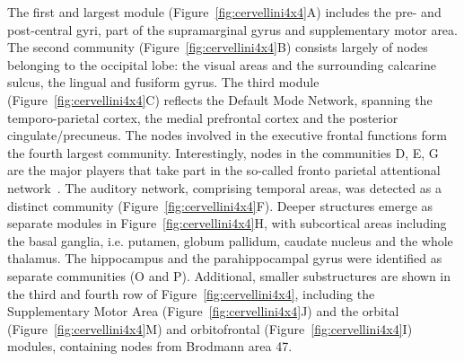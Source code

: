 The first and largest module (Figure~\ref{fig:cervellini4x4}A) includes the pre- and post-central gyri, part of the supramarginal gyrus and supplementary motor area.
The second community (Figure~\ref{fig:cervellini4x4}B) consists largely of nodes belonging to the occipital lobe: the visual areas and the surrounding calcarine sulcus, the lingual and fusiform gyrus.
The third module (Figure~\ref{fig:cervellini4x4}C) reflects the Default Mode Network, spanning the temporo-parietal cortex, the medial prefrontal cortex and the posterior cingulate/precuneus.
The nodes involved in the executive frontal functions form the fourth largest community.
Interestingly, nodes in the communities D, E, G are the major players that take part in the so-called fronto parietal attentional network~\cite{markett2014}.
The auditory network, comprising temporal areas, was detected as a distinct community (Figure~\ref{fig:cervellini4x4}F).
Deeper structures emerge as separate modules in Figure~\ref{fig:cervellini4x4}H, with subcortical areas including the basal ganglia, i.e.
putamen, globum pallidum, caudate nucleus and the whole thalamus.
The hippocampus and the parahippocampal gyrus were identified as separate communities (O and P).
Additional, smaller substructures are shown in the third and fourth row of Figure~\ref{fig:cervellini4x4}, including the Supplementary Motor Area (Figure~\ref{fig:cervellini4x4}J) and the orbital (Figure~\ref{fig:cervellini4x4}M) and orbitofrontal (Figure~\ref{fig:cervellini4x4}I) modules, containing nodes from Brodmann area 47.


